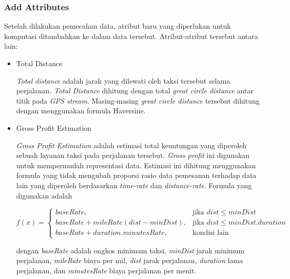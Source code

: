 \documentclass{article}
\begin{document}
\subsubsection{Add Attributes}

\begin{adjustwidth}{4em}{0pt}
	
	\hspace{\parindent}Setelah dilakukan pemecahan data, atribut baru yang diperlukan untuk komputasi ditambahkan ke dalam data tersebut. Atribut-atribut tersebut antara lain:
	
	\begin{itemize}
		\item{Total Distance}
		
		\textit{Total distance} adalah jarak yang dilewati oleh taksi tersebut selama perjalanan. \textit{Total Distance} dihitung dengan total \textit{great circle distance} antar titik pada \textit{GPS stream}. Masing-masing \textit{great circle distance} tersebut dihitung dengan menggunakan formula Haversine.
		
		\item{Gross Profit Estimation}
		
		\textit{Gross Profit Estimation} adalah estimasi  total keuntungan  yang diperoleh sebuah layanan taksi pada perjalanan tersebut. \textit{Gross profit} ini digunakan untuk mempermudah representasi data. Estimasi ini dihitung menggunakan formula yang tidak mengubah proporsi rasio data pemesanan terhadap data lain yang diperoleh berdasarkan \textit{time-rate} dan \textit{distance-rate}. Formula yang digunakan adalah
		
		\[
		f(x) = 
		\begin{cases}
		baseRate,& \text{jika } dist \leq minDist \\
		baseRate+mileRate(dist-minDist),& \text{jika } dist \le minDist.duration \\
		baseRate+duration.minutesRate, & \text{kondisi lain}
		\end{cases}
		\]
		
		dengan \textit{baseRate} adalah ongkos minimum taksi, \textit{minDist} jarak minimum perjalanan, \textit{mileRate} biaya per mil, \textit{dist} jarak perjalanan, \textit{duration} lama perjalanan, dan \textit{minutesRate} biaya perjalanan per menit.
		
	\end{itemize}
	
	
\end{adjustwidth}
\end{document}
